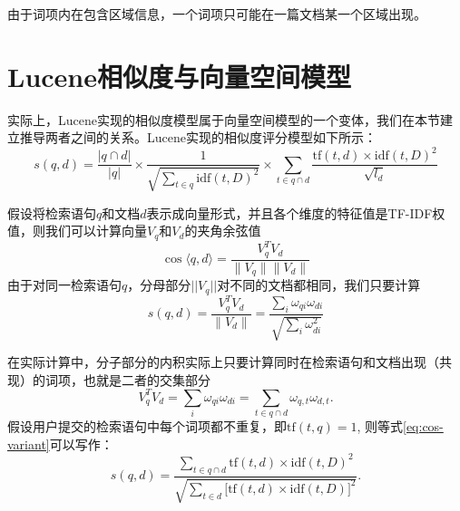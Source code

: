 \begin{remark}
由于词项内在包含区域信息，一个词项只可能在一篇文档某一个区域出现。
\end{remark}

\section{Lucene相似度与向量空间模型}
实际上，Lucene实现的相似度模型属于向量空间模型的一个变体，我们在本节建立推导两者之间的关系。Lucene实现的相似度评分模型如下所示：
\begin{equation}\label{eq:lucene-sim}
    s(q,d)= \frac{|q\cap d|}{|q|} \times \frac{1}{\sqrt{\sum\limits_{t \in q} \textrm{idf}(t,D)^2}} \times \sum\limits_{t \in q \cap d} \frac{\textrm{tf}(t,d)\times \textrm{idf}(t,D)^2}{\sqrt{l_d}}
\end{equation}

假设将检索语句$q$和文档$d$表示成向量形式，并且各个维度的特征值是TF-IDF权值，则我们可以计算向量$V_q$和$V_d$的夹角余弦值
\[
    \cos\langle q, d\rangle = \frac {V_q^T V_d}{\|V_q\|\|V_d\|}
\]
由于对同一检索语句$q$，分母部分$||V_q||$对不同的文档都相同，我们只要计算
\begin{equation}\label{eq:cos-variant}
    s(q,d) = \frac{V_q^T V_d}{\|V_d\|} = \frac{\sum\limits_i \omega_{qi} \omega_{di}}{\sqrt{\sum\limits_i \omega_{di}^2}}
\end{equation}

在实际计算中，分子部分的内积实际上只要计算同时在检索语句和文档出现（共现）的词项，也就是二者的交集部分
\begin{equation}\label{eq:inner-prod}
    V_q^T V_d = \sum\limits_i \omega_{qi} \omega_{di} = \sum\limits_{t \in q \cap d} \omega_{q,t} \omega_{d,t}.
\end{equation}
假设用户提交的检索语句中每个词项都不重复，即$\mathrm{tf}(t,q)=1$, 则等式\eqref{eq:cos-variant}可以写作：
\begin{equation}\label{eq:sim}
    s(q,d) = \frac{\sum\limits_{t \in q \cap d} \mathrm{tf}(t,d) \times \mathrm{idf}(t,D)^2}{\sqrt{\sum\limits_{t \in d} \big[\mathrm{tf}(t,d) \times \mathrm{idf}(t,D)\big]^2}}.
\end{equation}


